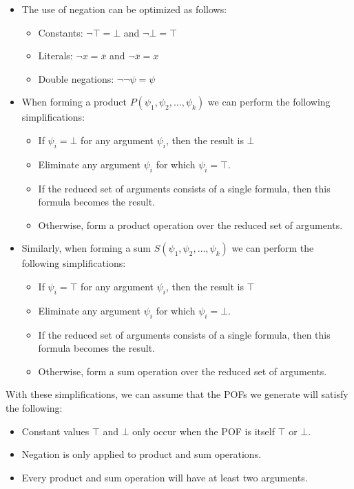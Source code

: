 \documentclass[letterpaper,USenglish,cleveref, autoref, thm-restate]{lipics-v2021}
\newcommand{\tautology}{\top}
\newcommand{\nil}{\bot}
\newcommand{\obar}[1]{\overline{#1}}
\begin{document}
\begin{itemize}
\item
The use of negation can be optimized as follows:
\begin{itemize}
\item Constants: $\neg \tautology = \nil$ and $\neg \nil = \tautology$
\item Literals: $\neg x = \obar{x}$ and $\neg \obar{x} = x$
\item Double negations: $\neg \neg \psi = \psi$
\end{itemize}

\item 
When forming a product $P(\psi_1, \psi_2, \ldots, \psi_k)$ we can perform the following simplifications:
\begin{itemize}
\item If $\psi_i = \nil$ for any argument $\psi_i$, then the result is $\nil$
\item Eliminate any argument $\psi_i$ for which $\psi_i = \tautology$.
\item If the reduced set of arguments consists of a single formula, then this formula becomes the result.
\item Otherwise, form a product operation over the reduced set of arguments.
\end{itemize}

\item
Similarly, when forming a sum $S(\psi_1, \psi_2, \ldots, \psi_k)$ we can perform the following simplifications:
\begin{itemize}
\item If $\psi_i = \tautology$ for any argument $\psi_i$, then the result is $\tautology$
\item Eliminate any argument $\psi_i$ for which $\psi_i = \nil$.
\item If the reduced set of arguments consists of a single formula, then this formula becomes the result.
\item Otherwise, form a sum operation over the reduced set of arguments.
\end{itemize}
\end{itemize}

With these simplifications, we can assume that the POFs we generate will satisfy the following:
\begin{itemize}
\item Constant values $\tautology$ and $\nil$ only occur when the POF is itself
  $\tautology$ or $\nil$.
\item Negation is only applied to product and sum operations.
\item Every product and sum operation will have at least two arguments.
\end{itemize}
\end{document}
